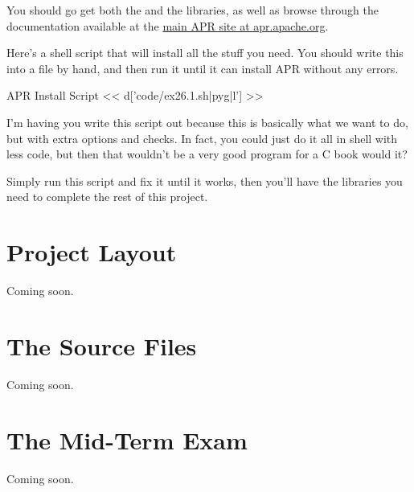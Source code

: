 You should go get both the  and the 
libraries, as well as browse through the documentation available at the 
\href{http://apr.apache.org/}{main APR site at apr.apache.org}.

Here's a shell script that will install all the stuff you need.  You
should write this into a file by hand, and then run it until it can
install APR without any errors.

\begin{code}{APR Install Script}
<< d['code/ex26.1.sh|pyg|l'] >>
\end{code}

I'm having you write this script out because this is basically what
we want  to do, but with extra options and checks.
In fact, you could just do it all in shell with less code, but then
that wouldn't be a very good program for a C book would it?

Simply run this script and fix it until it works, then you'll have the
libraries you need to complete the rest of this project.


\section{Project Layout}

Coming soon.

\section{The Source Files}

Coming soon.


\section{The Mid-Term Exam}

Coming soon.

